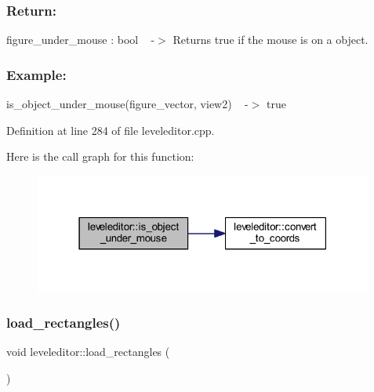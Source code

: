 \subsubsection*{Return\+: }

figure\+\_\+under\+\_\+mouse \+: bool ~\newline
-\/$>$ Returns true if the mouse is on a object. ~\newline


\subsubsection*{Example\+: }

is\+\_\+object\+\_\+under\+\_\+mouse(figure\+\_\+vector, view2) ~\newline
-\/$>$ true ~\newline


Definition at line 284 of file leveleditor.\+cpp.

Here is the call graph for this function\+:
\nopagebreak
\begin{figure}[H]
\begin{center}
\leavevmode
\includegraphics[width=316pt]{classleveleditor_af11cad8cf1e7999a04f6a8f2a4950794_cgraph}
\end{center}
\end{figure}
\mbox{\label{classleveleditor_a675038d66c5ea045d4e3b922e28a23ec}} 
\subsubsection{\texorpdfstring{load\+\_\+rectangles()}{load\_rectangles()}}
{\footnotesize\ttfamily void leveleditor\+::load\+\_\+rectangles (\begin{DoxyParamCaption}{ }\end{DoxyParamCaption})\hspace{0.3cm}{\ttfamily [private]}}



